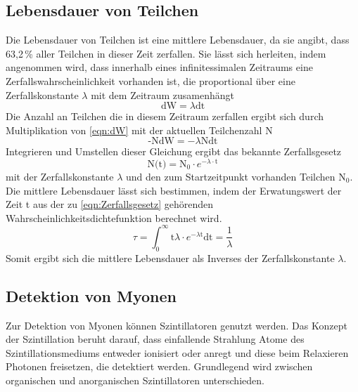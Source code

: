     \subsection{Lebensdauer von Teilchen}
        Die Lebensdauer von Teilchen ist eine mittlere Lebensdauer, da sie angibt, dass 63,2$\,$\% aller Teilchen in dieser Zeit zerfallen. Sie lässt sich herleiten, indem angenommen wird, dass innerhalb
        eines infinitessimalen Zeitraums eine Zerfallswahrscheinlichkeit vorhanden ist, die proportional über eine Zerfallskonstante $\lambda$ mit dem Zeitraum zusamenhängt
        \begin{equation}
            \text{dW} = \lambda \text{dt}
            \label{eqn:dW}
        \end{equation}
        Die Anzahl an Teilchen die in diesem Zeitraum zerfallen ergibt sich durch Multiplikation von \eqref{eqn:dW} mit der aktuellen Teilchenzahl N
        \begin{equation*}
            \text{-NdW} = -\lambda \text{Ndt}
        \end{equation*}
        Integrieren und Umstellen dieser Gleichung ergibt das bekannte Zerfallsgesetz
        \begin{equation}
            \text{N(t)} = \text{N}_0 \cdot e^{- \lambda \cdot \text{t}}
            \label{eqn:Zerfallsgesetz}
        \end{equation}
        mit der Zerfallskonstante $\lambda$ und den zum Startzeitpunkt vorhanden Teilchen $\text{N}_0$. Die mittlere Lebensdauer lässt sich bestimmen, indem der Erwatungswert der Zeit t aus der zu 
        \eqref{eqn:Zerfallsgesetz} gehörenden Wahrscheinlichkeitsdichtefunktion berechnet wird.
        \begin{equation}
            \tau = \int_0^{\infty} \text{t} \lambda \cdot e^{-\lambda \text{t}} \text{dt} = \frac{1}{\lambda}
            \label{eqn:mittlere_Lebensdauer}
        \end{equation}
        Somit ergibt sich die mittlere Lebensdauer als Inverses der Zerfallskonstante $\lambda$.

    \newpage
    \subsection{Detektion von Myonen}
        Zur Detektion von Myonen können Szintillatoren genutzt werden. Das Konzept der Szintillation beruht darauf, dass einfallende Strahlung Atome des Szintillationsmediums entweder ionisiert oder anregt und 
        diese beim Relaxieren Photonen freisetzen, die detektiert werden. Grundlegend wird zwischen organischen und anorganischen Szintillatoren unterschieden.

